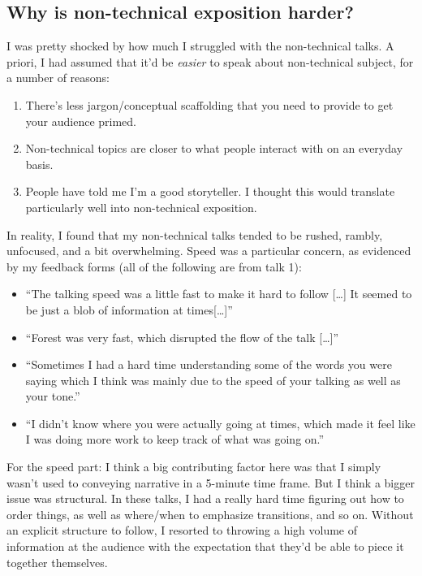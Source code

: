 \documentclass{fkpset}
\begin{document}
\begin{solution}[Response.]
  \section{Why is non-technical exposition harder?}
  I was pretty shocked by how much I struggled with the non-technical
  talks. A priori, I had assumed that it'd be \emph{easier} to speak
  about non-technical subject, for a number of reasons:
  \begin{enumerate}[label=(\roman*)]
    \item There's less jargon/conceptual scaffolding that you need to
      provide to get your audience primed.
    \item Non-technical topics are closer to what people interact with
      on an everyday basis.
    \item People have told me I'm a good storyteller. I thought this
      would translate particularly well into non-technical exposition.
  \end{enumerate}
  In reality, I found that my non-technical talks tended to be
  rushed, rambly, unfocused, and a bit overwhelming. Speed was a
  particular concern, as evidenced by my feedback forms (all of the
  following are from talk 1):
  \begin{itemize}
    \item ``The talking speed was a little fast to make it hard to
      follow [\ldots] It seemed to be just a blob of information at
      times[\ldots]''
    \item ``Forest was very fast, which disrupted the flow of the talk
      [\ldots]''
    \item ``Sometimes I had a hard time understanding some of the
      words you were saying which I think was mainly due to the speed
      of your talking as well as your tone.''
    \item ``I didn't know where you were actually going at times,
      which made it feel like I was doing more work to keep track of
      what was going on.''
  \end{itemize}
  For the speed part: I think a big contributing factor here was that
  I simply wasn't used to conveying narrative in a 5-minute time
  frame. But I think a bigger issue was structural. In these talks, I
  had a really hard time figuring out how to order things, as well as
  where/when to emphasize transitions, and so on. Without an explicit
  structure to follow, I resorted to throwing a high volume of
  information at the audience with the expectation that they'd be able
  to piece it together themselves.


\end{solution}
\end{document}
